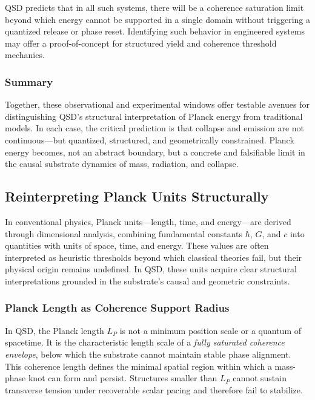 \documentclass[entropy,article,submit,pdftex,moreauthors]{Definitions/mdpi}
\begin{document}
QSD predicts that in all such systems, there will be a coherence saturation limit beyond which energy cannot be supported in a single domain without triggering a quantized release or phase reset. Identifying such behavior in engineered systems may offer a proof-of-concept for structured yield and coherence threshold mechanics.

\subsubsection{Summary}

Together, these observational and experimental windows offer testable avenues for distinguishing QSD's structural interpretation of Planck energy from traditional models. In each case, the critical prediction is that collapse and emission are not continuous—but quantized, structured, and geometrically constrained. Planck energy becomes, not an abstract boundary, but a concrete and falsifiable limit in the causal substrate dynamics of mass, radiation, and collapse.
\subsection{Reinterpreting Planck Units Structurally}

In conventional physics, Planck units---length, time, and energy---are derived through dimensional analysis, combining fundamental constants $\hbar$, $G$, and $c$ into quantities with units of space, time, and energy. These values are often interpreted as heuristic thresholds beyond which classical theories fail, but their physical origin remains undefined. In QSD, these units acquire clear structural interpretations grounded in the substrate’s causal and geometric constraints.

\subsubsection{Planck Length as Coherence Support Radius}

In QSD, the Planck length $L_P$ is not a minimum position scale or a quantum of spacetime. It is the characteristic length scale of a \textit{fully saturated coherence envelope}, below which the substrate cannot maintain stable phase alignment. This coherence length defines the minimal spatial region within which a mass-phase knot can form and persist. Structures smaller than $L_P$ cannot sustain transverse tension under recoverable scalar pacing and therefore fail to stabilize.
\end{document}
